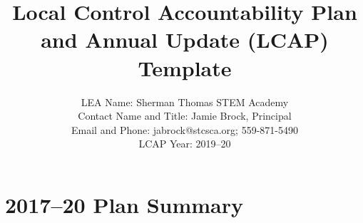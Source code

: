 \documentclass{article}
\begin{document}
\title{Local Control Accountability Plan and Annual Update (LCAP) Template}
\author{
LEA Name: Sherman Thomas STEM Academy\\
Contact Name and Title: Jamie Brock, Principal\\
Email and Phone: jabrock@stcsca.org; 559-871-5490\\
LCAP Year: 2019--20
}
\date{}

\maketitle

\section{2017--20 Plan Summary}
\end{document}
